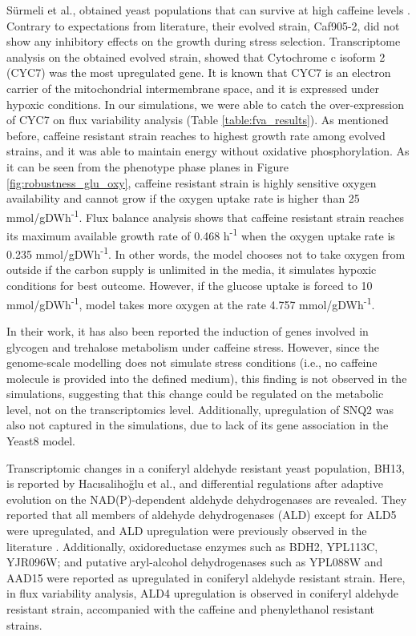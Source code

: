 Sürmeli et al., obtained yeast populations that can survive at high caffeine levels \cite{Srmeli2019}. Contrary to expectations from literature, their evolved strain, Caf905-2, did not show any inhibitory effects on the growth during stress selection. Transcriptome analysis on the obtained evolved strain, showed that Cytochrome c isoform 2 (CYC7) was the most upregulated gene. It is known that CYC7 is an electron carrier of the mitochondrial intermembrane space, and it is expressed under hypoxic conditions. In our simulations, we were able to catch the over-expression of CYC7 on flux variability analysis (Table \ref{table:fva_results}). As mentioned before, caffeine resistant strain reaches to highest growth rate among evolved strains, and it was able to maintain energy without oxidative phosphorylation. As it can be seen from the phenotype phase planes in Figure \ref{fig:robustness_glu_oxy}, caffeine resistant strain is highly sensitive oxygen availability and cannot grow if the oxygen uptake rate is higher than 25 mmol/gDWh\textsuperscript{-1}. Flux balance analysis shows that caffeine resistant strain reaches its maximum available growth rate of 0.468 h\textsuperscript{-1} when the oxygen uptake rate is 0.235 mmol/gDWh\textsuperscript{-1}. In other words, the model chooses not to take oxygen from outside if the carbon supply is unlimited in the media, it simulates hypoxic conditions for best outcome. However, if the glucose uptake is forced to 10 mmol/gDWh\textsuperscript{-1}, model takes more oxygen at the rate 4.757 mmol/gDWh\textsuperscript{-1}.

In their work, it has also been reported the induction of genes involved in glycogen and trehalose metabolism under caffeine stress. However, since the genome-scale modelling does not simulate stress conditions (i.e., no caffeine molecule is provided into the defined medium), this finding is not observed in the simulations, suggesting that this change could be regulated on the metabolic level, not on the transcriptomics level. Additionally, upregulation of SNQ2 was also not captured in the simulations, due to lack of its gene association in the Yeast8 model.

Transcriptomic changes in a coniferyl aldehyde resistant yeast population, BH13, is reported by Hacısalihoğlu et al., and differential regulations after adaptive evolution on the NAD(P)-dependent aldehyde dehydrogenases are revealed. They reported that all members of aldehyde dehydrogenases (ALD) except for ALD5 were upregulated, and ALD upregulation were previously observed in the literature \cite{adeboye2015catabolism}. Additionally, oxidoreductase enzymes such as BDH2, YPL113C, YJR096W; and putative aryl-alcohol dehydrogenases such as YPL088W and AAD15 were reported as upregulated in coniferyl aldehyde resistant strain. Here, in flux variability analysis, ALD4 upregulation is observed in coniferyl aldehyde resistant strain, accompanied with the caffeine and phenylethanol resistant strains.


